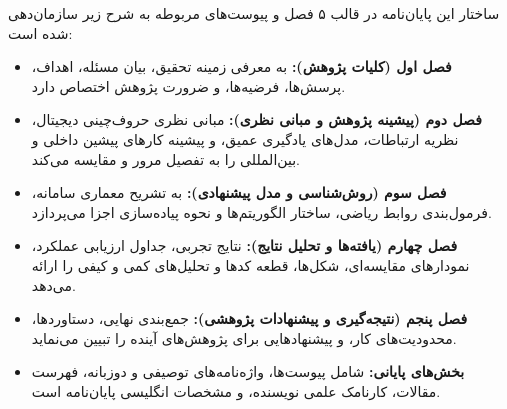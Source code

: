ساختار این پایان‌نامه در قالب ۵ فصل و پیوست‌های مربوطه به شرح زیر سازمان‌دهی شده است:
\begin{itemize}
  \item \textbf{فصل اول (کلیات پژوهش):} به معرفی زمینه تحقیق، بیان مسئله، اهداف، پرسش‌ها، فرضیه‌ها، و ضرورت پژوهش اختصاص دارد.
  \item \textbf{فصل دوم (پیشینه پژوهش و مبانی نظری):} مبانی نظری حروف‌چینی دیجیتال، نظریه ارتباطات، مدل‌های یادگیری عمیق، و پیشینه کارهای پیشین داخلی و بین‌المللی را به تفصیل مرور و مقایسه می‌کند.
  \item \textbf{فصل سوم (روش‌شناسی و مدل پیشنهادی):} به تشریح معماری سامانه، فرمول‌بندی روابط ریاضی، ساختار الگوریتم‌ها و نحوه پیاده‌سازی اجزا می‌پردازد.
  \item \textbf{فصل چهارم (یافته‌ها و تحلیل نتایج):} نتایج تجربی، جداول ارزیابی عملکرد، نمودارهای مقایسه‌ای، شکل‌ها، قطعه کدها و تحلیل‌های کمی و کیفی را ارائه می‌دهد.
  \item \textbf{فصل پنجم (نتیجه‌گیری و پیشنهادات پژوهشی):} جمع‌بندی نهایی، دستاوردها، محدودیت‌های کار، و پیشنهادهایی برای پژوهش‌های آینده را تبیین می‌نماید.
  \item \textbf{بخش‌های پایانی:} شامل پیوست‌ها، واژه‌نامه‌های توصیفی و دوزبانه، فهرست مقالات، کارنامک علمی نویسنده، و مشخصات انگلیسی پایان‌نامه است.
\end{itemize}
